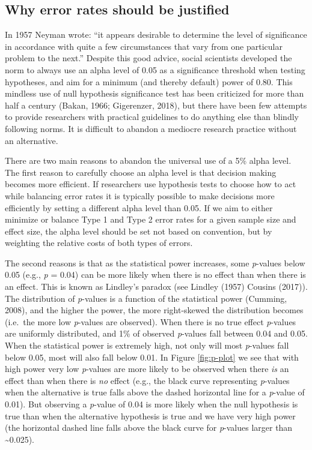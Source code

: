 \documentclass[,jou,floatsintext]{apa6}
\begin{document}
\hypertarget{why-error-rates-should-be-justified}{%
\subsection{Why error rates should be justified}\label{why-error-rates-should-be-justified}}

In 1957 Neyman wrote: \enquote{it appears desirable to determine the level of significance in accordance with quite a few circumstances that vary from one particular problem to the next.} Despite this good advice, social scientists developed the norm to always use an alpha level of 0.05 as a significance threshold when testing hypotheses, and aim for a minimum (and thereby default) power of 0.80. This mindless use of null hypothesis significance test has been criticized for more than half a century (Bakan, 1966; Gigerenzer, 2018), but there have been few attempts to provide researchers with practical guidelines to do anything else than blindly following norms. It is difficult to abandon a mediocre research practice without an alternative.

There are two main reasons to abandon the universal use of a 5\% alpha level. The first reason to carefully choose an alpha level is that decision making becomes more efficient. If researchers use hypothesis tests to choose how to act while balancing error rates it is typically possible to make decisions more efficiently by setting a different alpha level than 0.05. If we aim to either minimize or balance Type 1 and Type 2 error rates for a given sample size and effect size, the alpha level should be set not based on convention, but by weighting the relative costs of both types of errors.

The second reasons is that as the statistical power increases, some \emph{p}-values below 0.05 (e.g., \emph{p} = 0.04) can be more likely when there is no effect than when there is an effect. This is known as Lindley's paradox (see Lindley (1957) Cousins (2017)). The distribution of \emph{p}-values is a function of the statistical power (Cumming, 2008), and the higher the power, the more right-skewed the distribution becomes (i.e.~the more low \emph{p}-values are observed). When there is no true effect \emph{p}-values are uniformly distributed, and 1\% of observed \emph{p}-values fall between 0.04 and 0.05. When the statistical power is extremely high, not only will most \emph{p}-values fall below 0.05, most will also fall below 0.01. In Figure \ref{fig:p-plot} we see that with high power very low \emph{p}-values are more likely to be observed when there \emph{is} an effect than when there is \emph{no} effect (e.g., the black curve representing \emph{p}-values when the alternative is true falls above the dashed horizontal line for a \emph{p}-value of 0.01). But observing a \emph{p}-value of 0.04 is more likely when the null hypothesis is true than when the alternative hypothesis is true and we have very high power (the horizontal dashed line falls above the black curve for \emph{p}-values larger than \textasciitilde0.025).
\end{document}
